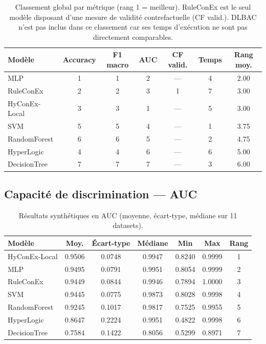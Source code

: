 \documentclass[12pt,a4paper]{article}
\begin{document}
\begin{table}[htbp]
  \centering
  \caption{Classement global par métrique (rang 1 = meilleur). RuleConEx est
           le seul modèle disposant d'une mesure de validité contrefactuelle
           (CF valid.). DLBAC n'est pas inclus dans ce classement car ses
           temps d'exécution ne sont pas directement comparables.}
  \label{tab:ranking_global}
  \small
  \begin{tabular}{lcccccc}
    \toprule
    \textbf{Modèle} & \textbf{Accuracy} & \textbf{F1 macro} & \textbf{AUC}
      & \textbf{CF valid.} & \textbf{Temps} & \textbf{Rang moy.} \\
    \midrule
    MLP          & 1 & 1 & 2 & --- & 4 & 2.00 \\
    RuleConEx    & 2 & 2 & 3 & 1   & 7 & 3.00 \\
    HyConEx-Local & 3 & 3 & 1 & --- & 5 & 3.00 \\
    SVM          & 5 & 5 & 4 & --- & 1 & 3.75 \\
    RandomForest & 6 & 6 & 5 & --- & 2 & 4.75 \\
    HyperLogic   & 4 & 4 & 6 & --- & 6 & 5.00 \\
    DecisionTree & 7 & 7 & 7 & --- & 3 & 6.00 \\
    \bottomrule
  \end{tabular}
\end{table}

\subsection{Capacité de discrimination — AUC}
\label{sec:auc}

\begin{table}[htbp]
  \centering
  \caption{Résultats synthétiques en AUC (moyenne, écart-type, médiane sur
           11 datasets).}
  \label{tab:auc_summary}
  \small
  \begin{tabular}{lcccccc}
    \toprule
    \textbf{Modèle} & \textbf{Moy.} & \textbf{Écart-type}
      & \textbf{Médiane} & \textbf{Min} & \textbf{Max} & \textbf{Rang} \\
    \midrule
    HyConEx-Local & 0.9506 & 0.0748 & 0.9947 & 0.8240 & 0.9999 & 1 \\
    MLP           & 0.9495 & 0.0791 & 0.9951 & 0.8054 & 0.9999 & 2 \\
    RuleConEx     & 0.9449 & 0.0844 & 0.9946 & 0.7894 & 1.0000 & 3 \\
    SVM           & 0.9445 & 0.0775 & 0.9873 & 0.8028 & 0.9998 & 4 \\
    RandomForest  & 0.9245 & 0.1017 & 0.9817 & 0.7525 & 0.9955 & 5 \\
    HyperLogic    & 0.8647 & 0.2224 & 0.9951 & 0.4822 & 0.9998 & 6 \\
    DecisionTree  & 0.7584 & 0.1422 & 0.8056 & 0.5299 & 0.8971 & 7 \\
    \bottomrule
  \end{tabular}
\end{table}
\end{document}
